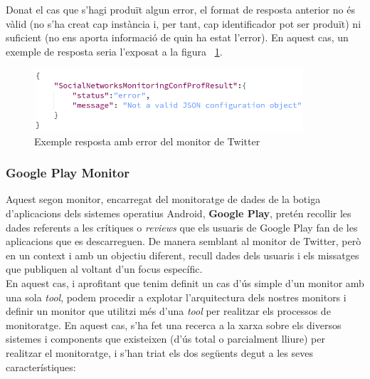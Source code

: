 Donat el cas que s'hagi produït algun error, el format de resposta anterior no és vàlid (no s'ha creat cap instància i, per tant, cap identificador pot ser produït) ni suficient (no ens aporta informació de quin ha estat l'error). En aquest cas, un exemple de resposta seria l'exposat a la figura ~\ref{fig:Figura10}.

\begin{figure}[!h]
\centering
\includegraphics[width=10cm]{Figures/Figure10}
\decoRule
\caption[Exemple resposta amb error del monitor de  Twitter]{Exemple resposta amb error del monitor de Twitter}
\label{fig:Figura10}
\end{figure}

\subsubsection{Google Play Monitor}

Aquest segon monitor, encarregat del monitoratge de dades de la botiga d'aplicacions dels sistemes operatius Android, \textbf{Google Play}, pretén recollir les dades referents a les crítiques o \textit{reviews} que els usuaris de Google Play fan de les aplicacions que es descarreguen. De manera semblant al monitor de Twitter, però en un context i amb un objectiu diferent, recull dades dels usuaris i els missatges que publiquen al voltant d'un focus específic.\\

En aquest cas, i aprofitant que tenim definit un cas d'ús simple d'un monitor amb una sola \textit{tool}, podem procedir a explotar l'arquitectura dels nostres monitors i definir un monitor que utilitzi més d'una \textit{tool} per realitzar els processos de monitoratge. En aquest cas, s'ha fet una recerca a la xarxa sobre els diversos sistemes i components que existeixen (d'ús total o parcialment lliure) per realitzar el monitoratge, i s'han triat els dos següents degut a les seves característiques:

